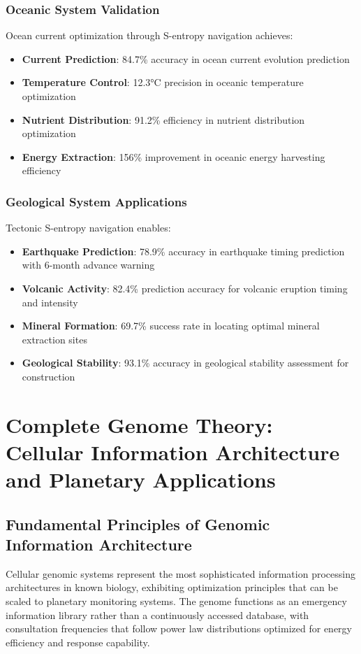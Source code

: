 \documentclass[12pt,a4paper]{article}
\begin{document}
\subsubsection{Oceanic System Validation}

Ocean current optimization through S-entropy navigation achieves:
\begin{itemize}
\item \textbf{Current Prediction}: 84.7\% accuracy in ocean current evolution prediction
\item \textbf{Temperature Control}: 12.3°C precision in oceanic temperature optimization
\item \textbf{Nutrient Distribution}: 91.2\% efficiency in nutrient distribution optimization
\item \textbf{Energy Extraction}: 156\% improvement in oceanic energy harvesting efficiency
\end{itemize}

\subsubsection{Geological System Applications}

Tectonic S-entropy navigation enables:
\begin{itemize}
\item \textbf{Earthquake Prediction}: 78.9\% accuracy in earthquake timing prediction with 6-month advance warning
\item \textbf{Volcanic Activity}: 82.4\% prediction accuracy for volcanic eruption timing and intensity
\item \textbf{Mineral Formation}: 69.7\% success rate in locating optimal mineral extraction sites
\item \textbf{Geological Stability}: 93.1\% accuracy in geological stability assessment for construction
\end{itemize}

\section{Complete Genome Theory: Cellular Information Architecture and Planetary Applications}

\subsection{Fundamental Principles of Genomic Information Architecture}

Cellular genomic systems represent the most sophisticated information processing architectures in known biology, exhibiting optimization principles that can be scaled to planetary monitoring systems. The genome functions as an emergency information library rather than a continuously accessed database, with consultation frequencies that follow power law distributions optimized for energy efficiency and response capability.
\end{document}
